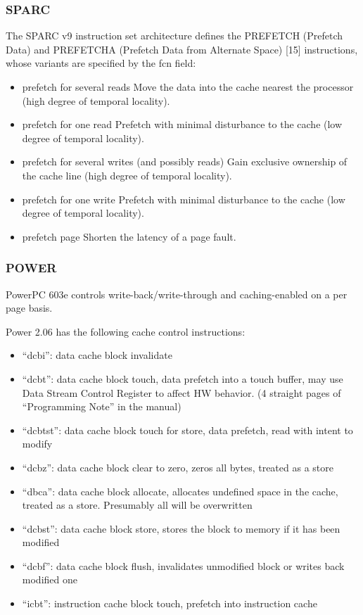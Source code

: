 \subsubsection{SPARC}
The SPARC v9 instruction set architecture defines the PREFETCH (Prefetch Data) and PREFETCHA (Prefetch Data from Alternate Space) [15] instructions, whose variants are specified by the fcn field:
\begin{itemize}
\item prefetch for several reads  Move the data into the cache nearest the processor (high degree of temporal locality).
\item prefetch for one read Prefetch with minimal disturbance to the cache (low degree of temporal locality).
\item prefetch for several writes (and possibly reads)  Gain exclusive ownership of the cache line (high degree of temporal locality).
\item prefetch for one write  Prefetch with minimal disturbance to the cache (low degree of temporal locality).
\item prefetch page Shorten the latency of a page fault.
\end{itemize}


\subsubsection{POWER}
PowerPC 603e controls write-back/write-through and caching-enabled on a per page basis. 

Power 2.06 has the following cache control instructions:
\begin{itemize}
\item ``dcbi'': data cache block invalidate
\item ``dcbt'': data cache block touch, data prefetch into a touch buffer, may use Data Stream Control Register to affect HW behavior. (4 straight pages of ``Programming Note'' in the manual)
\item ``dcbtst'': data cache block touch for store, data prefetch, read with intent to modify
\item ``dcbz'': data cache block clear to zero, zeros all bytes, treated as a store
\item ``dbca'': data cache block allocate, allocates undefined space in the cache, treated as a store. Presumably all will be overwritten
\item ``dcbst'': data cache block store, stores the block to memory if it has been modified
\item ``dcbf'': data cache block flush, invalidates unmodified block or writes back modified one
\item ``icbt'': instruction cache block touch, prefetch into instruction cache
\end{itemize}

